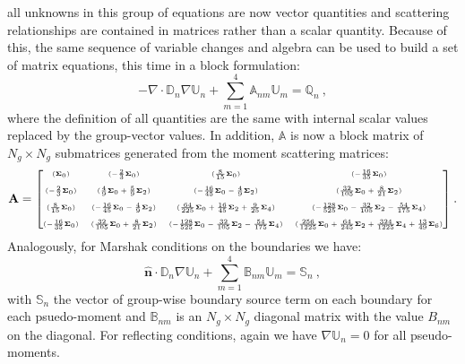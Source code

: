 all unknowns in this group of equations are now vector quantities and
scattering relationships are contained in matrices rather than a
scalar quantity. Because of this, the same sequence of variable
changes and algebra can be used to build a set of matrix equations,
this time in a block formulation:
\begin{equation}
  -\nabla \cdot \mathbb{D}_n \nabla \mathbb{U}_n + \sum_{m=1}^4
  \mathbb{A}_{nm} \mathbb{U}_m = \mathbb{Q}_n\:,
  \label{eq:spn_multigroup_system}
\end{equation}
where the definition of all quantities are the same with internal
scalar values replaced by the group-vector values. In addition,
$\mathbb{A}$ is now a block matrix of $N_g \times N_g$ submatrices
generated from the moment scattering matrices:
\begin{equation}
  \mathbf{A} = 
  {\tiny \begin{bmatrix}
    (\mathbf{\Sigma}_0) &
    (-\frac{2}{3}\mathbf{\Sigma}_0) &
    (\frac{8}{15}\mathbf{\Sigma}_0) &
    (-\frac{16}{35}\mathbf{\Sigma}_0) \\
    &&&\\
    (-\frac{2}{3}\mathbf{\Sigma}_0) &
    (\frac{4}{9}\mathbf{\Sigma}_0 + \frac{5}{9}\mathbf{\Sigma}_2) &
    (-\frac{16}{45}\mathbf{\Sigma}_0 - \frac{4}{9}\mathbf{\Sigma}_2) &
    (\frac{32}{105}\mathbf{\Sigma}_0 + \frac{8}{21}\mathbf{\Sigma}_2) \\
    &&&\\
    (\frac{8}{15}\mathbf{\Sigma}_0) &
    (-\frac{16}{45}\mathbf{\Sigma}_0 - \frac{4}{9}\mathbf{\Sigma}_2) &
    (\frac{64}{225}\mathbf{\Sigma}_0 + \frac{16}{45}\mathbf{\Sigma}_2 + \frac{9}{25}\mathbf{\Sigma}_4) &
    (-\frac{128}{525}\mathbf{\Sigma}_0 - \frac{32}{105}\mathbf{\Sigma}_2 - \frac{54}{175}\mathbf{\Sigma}_4)
    \\ 
    &&&\\
    (-\frac{16}{35}\mathbf{\Sigma}_0) &
    (\frac{32}{105}\mathbf{\Sigma}_0 + \frac{8}{21}\mathbf{\Sigma}_2) &
    (-\frac{128}{525}\mathbf{\Sigma}_0 - \frac{32}{105}\mathbf{\Sigma}_2 - \frac{54}{175}\mathbf{\Sigma}_4)
    & 
    (\frac{256}{1225}\mathbf{\Sigma}_0 + \frac{64}{245}\mathbf{\Sigma}_2 +
    \frac{324}{1225}\mathbf{\Sigma}_4 + \frac{13}{49}\mathbf{\Sigma}_6)
  \end{bmatrix}}\:.
  \label{eq:A_block_matrix}
\end{equation}
Analogously, for Marshak conditions on the boundaries we have:
\begin{equation}
  \hat{\mathbf{n}} \cdot \mathbb{D}_n \nabla \mathbb{U}_n +
  \sum_{m=1}^4 \mathbb{B}_{nm} \mathbb{U}_m = \mathbb{S}_n\:,
  \label{eq:spn_multigroup_bnd}
\end{equation}
with $\mathbb{S}_n$ the vector of group-wise boundary source term on
each boundary for each psuedo-moment and $\mathbb{B}_{nm}$ is an $N_g
\times N_g$ diagonal matrix with the value $B_{nm}$ on the
diagonal. For reflecting conditions, again we have $\nabla
\mathbb{U}_n = 0$ for all pseudo-moments.

